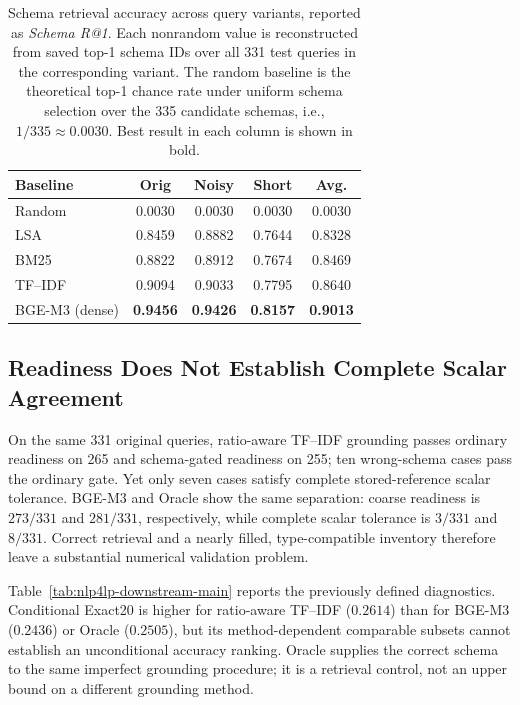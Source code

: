 \documentclass[pdflatex,sn-basic,Numbered]{sn-jnl}
\begin{document}
\begin{table}[t]
  \centering
  \caption{Schema retrieval accuracy across query variants, reported as \textit{Schema R@1}. Each nonrandom value is reconstructed from saved top-1 schema IDs over all 331 test queries in the corresponding variant. The random baseline is the theoretical top-1 chance rate under uniform schema selection over the 335 candidate schemas, i.e., $1/335 \approx 0.0030$. Best result in each column is shown in bold.}
  \label{tab:nlp4lp-retrieval-main}
  \small
  \begin{tabular}{lcccc}
    \toprule
    Baseline & Orig & Noisy & Short & Avg. \\
    \midrule
    Random  & 0.0030 & 0.0030 & 0.0030 & 0.0030 \\
    LSA     & 0.8459 & 0.8882 & 0.7644 & 0.8328 \\
    BM25    & 0.8822 & 0.8912 & 0.7674 & 0.8469 \\
    TF--IDF & 0.9094 & 0.9033 & 0.7795 & 0.8640 \\
    BGE-M3 (dense) & \textbf{0.9456} & \textbf{0.9426} & \textbf{0.8157} & \textbf{0.9013} \\
    \bottomrule
  \end{tabular}
\end{table}
\subsection{Readiness Does Not Establish Complete Scalar Agreement}
\label{subsec:exp_downstream}
On the same 331 original queries, ratio-aware TF--IDF grounding passes ordinary readiness on 265 and schema-gated readiness on 255; ten wrong-schema cases pass the ordinary gate. Yet only seven cases satisfy complete stored-reference scalar tolerance. BGE-M3 and Oracle show the same separation: coarse readiness is $273/331$ and $281/331$, respectively, while complete scalar tolerance is $3/331$ and $8/331$. Correct retrieval and a nearly filled, type-compatible inventory therefore leave a substantial numerical validation problem.

Table~\ref{tab:nlp4lp-downstream-main} reports the previously defined diagnostics. Conditional Exact20 is higher for ratio-aware TF--IDF ($0.2614$) than for BGE-M3 ($0.2436$) or Oracle ($0.2505$), but its method-dependent comparable subsets cannot establish an unconditional accuracy ranking. Oracle supplies the correct schema to the same imperfect grounding procedure; it is a retrieval control, not an upper bound on a different grounding method.
\end{document}
